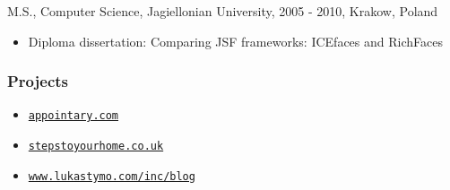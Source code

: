 \documentclass[]{rss}
\providecommand{\tightlist}{%
  \setlength{\itemsep}{0pt}\setlength{\parskip}{0pt}}
\begin{document}
\begin{resume}
M.S., Computer Science, Jagiellonian University, 2005 - 2010, Krakow,
Poland

\begin{itemize}
\tightlist
\item
  Diploma dissertation: Comparing JSF frameworks: ICEfaces and RichFaces
\end{itemize}

\subsubsection{Projects}\label{projects}

\begin{itemize}
\tightlist
\item
  \href{https://appointary.com}{\texttt{appointary.com}}
\item
  \href{http://stepstoyourhome.co.uk}{\texttt{stepstoyourhome.co.uk}}
\item
  \href{http://www.lukastymo.com/inc/blog}{\texttt{www.lukastymo.com/inc/blog}}
\end{itemize}

\end{resume}
\end{document}
